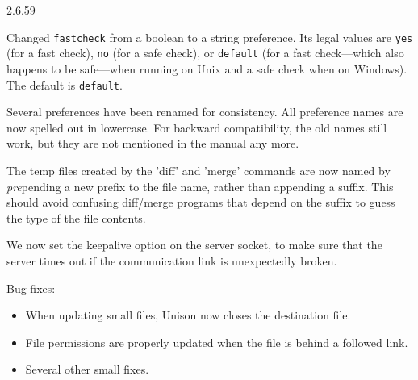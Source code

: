 \begin{changesfromversion}{2.6.59}
\item Changed \verb|fastcheck| from a boolean to a string preference.  Its 
  legal values are \verb|yes| (for a fast check), \verb|no| (for a safe 
  check), or \verb|default| (for a fast check---which also happens to be 
  safe---when running on Unix and a safe check when on Windows).  The default 
  is \verb|default|.
  \item Several preferences have been renamed for consistency.  All
  preference names are now spelled out in lowercase.  For backward
  compatibility, the old names still work, but they are not mentioned in
  the manual any more.
\item The temp files created by the 'diff' and 'merge' commands are now
   named by {\em pre}pending a new prefix to the file name, rather than
   appending a suffix.  This should avoid confusing diff/merge programs
   that depend on the suffix  to guess the type of the file contents.
\item We now set the keepalive option on the server socket, to make sure
  that the server times out if the communication link is unexpectedly broken. 
\item Bug fixes:
\begin{itemize}
\item When updating small files, Unison now closes the destination file.
\item File permissions are properly updated when the file is behind a
  followed link.
\item Several other small fixes.
\end{itemize}
\end{changesfromversion}


